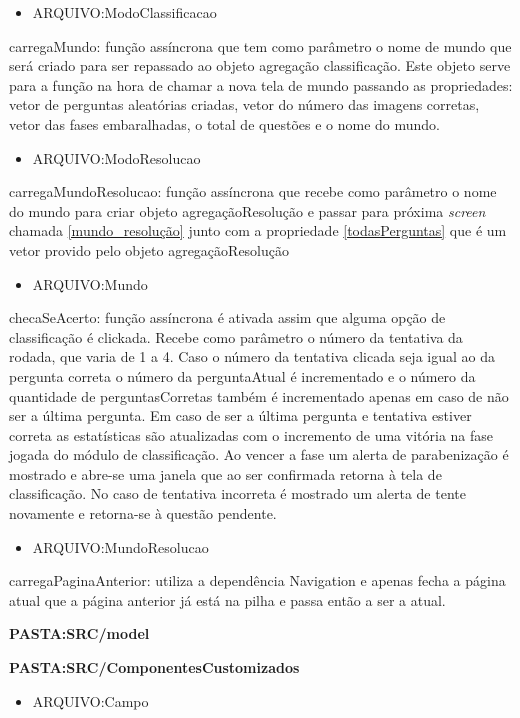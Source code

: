 \begin{itemize}
\item ARQUIVO:ModoClassificacao
\end{itemize}
carregaMundo: função assíncrona que tem como parâmetro o nome de mundo que será criado para ser repassado ao objeto agregação classificação. Este objeto serve para a função na hora de chamar a nova tela de mundo passando as propriedades: vetor de perguntas aleatórias criadas, vetor do número das imagens corretas, vetor das fases embaralhadas, o total de questões e o nome do mundo.

\begin{itemize}
\item ARQUIVO:ModoResolucao
\end{itemize}	
carregaMundoResolucao: função assíncrona que recebe como parâmetro o nome do mundo para criar objeto agregaçãoResolução e passar para próxima \textit{screen} chamada \ref{mundo_resolução} junto com a propriedade \ref{todasPerguntas} que é um vetor provido pelo objeto agregaçãoResolução

\begin{itemize}
\item ARQUIVO:Mundo
\end{itemize}	
checaSeAcerto: função assíncrona é ativada assim que alguma opção de classificação é clickada. Recebe como parâmetro o número da tentativa da rodada, que varia de 1 a 4. Caso o número da tentativa clicada seja igual ao da pergunta correta o número da perguntaAtual é incrementado e o número da quantidade de perguntasCorretas também é incrementado apenas em caso de não ser a última pergunta. Em caso de ser a última pergunta e tentativa estiver correta as estatísticas são atualizadas com o incremento de uma vitória na fase jogada do módulo de classificação. Ao vencer a fase um alerta de parabenização é mostrado e abre-se uma janela que ao ser confirmada retorna à tela de classificação. No caso de tentativa incorreta é mostrado um alerta de tente novamente e retorna-se à questão pendente. 

\begin{itemize}
\item ARQUIVO:MundoResolucao
\end{itemize}
carregaPaginaAnterior: utiliza a dependência Navigation e apenas fecha a página atual que a página anterior já está na pilha e passa então a ser a atual.


\textbf{PASTA:SRC/model}


\textbf{PASTA:SRC/ComponentesCustomizados}
\begin{itemize}
\item ARQUIVO:Campo
\end{itemize}

